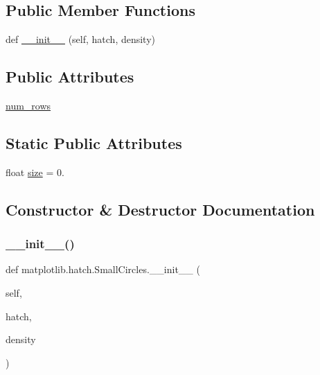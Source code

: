 \subsection*{Public Member Functions}
\begin{DoxyCompactItemize}
\item 
def \hyperlink{classmatplotlib_1_1hatch_1_1SmallCircles_a7407329e2e46586f1edb2310a245f106}{\+\_\+\+\_\+init\+\_\+\+\_\+} (self, hatch, density)
\end{DoxyCompactItemize}
\subsection*{Public Attributes}
\begin{DoxyCompactItemize}
\item 
\hyperlink{classmatplotlib_1_1hatch_1_1SmallCircles_ae44443f996068ff3f45b5edfff9974da}{num\+\_\+rows}
\end{DoxyCompactItemize}
\subsection*{Static Public Attributes}
\begin{DoxyCompactItemize}
\item 
float \hyperlink{classmatplotlib_1_1hatch_1_1SmallCircles_ae7bca8126e045ac574e1812a0994c8b7}{size} = 0.
\end{DoxyCompactItemize}


\subsection{Constructor \& Destructor Documentation}
\mbox{\label{classmatplotlib_1_1hatch_1_1SmallCircles_a7407329e2e46586f1edb2310a245f106}} 
\subsubsection{\texorpdfstring{\+\_\+\+\_\+init\+\_\+\+\_\+()}{\_\_init\_\_()}}
{\footnotesize\ttfamily def matplotlib.\+hatch.\+Small\+Circles.\+\_\+\+\_\+init\+\_\+\+\_\+ (\begin{DoxyParamCaption}\item[{}]{self,  }\item[{}]{hatch,  }\item[{}]{density }\end{DoxyParamCaption})}



